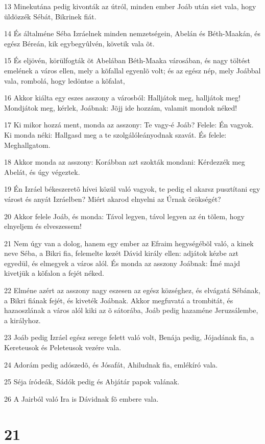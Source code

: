 \par 13 Minekutána pedig kivonták az útról, minden ember Joáb után siet vala, hogy üldözzék Sébát, Bikrinek fiát.
\par 14 És általméne Séba Izráelnek minden nemzetségein, Abelán és Béth-Maakán, és egész Béreán, kik egybegyûlvén, követik vala õt.
\par 15 És eljövén, körülfogták õt Abelában Béth-Maaka városában, és nagy töltést emelének a város ellen, mely a kõfallal egyenlõ volt; és az egész nép, mely Joábbal vala, rombolá, hogy ledöntse a kõfalat,
\par 16 Akkor kiálta egy eszes asszony a városból: Halljátok meg, halljátok meg! Mondjátok meg, kérlek, Joábnak: Jõjj ide hozzám, valamit mondok néked!
\par 17 Ki mikor hozzá ment, monda az asszony: Te vagy-é Joáb? Felele: Én vagyok. Ki monda néki: Hallgasd meg a te szolgálóleányodnak szavát. És felele: Meghallgatom.
\par 18 Akkor monda az asszony: Korábban azt szokták mondani: Kérdezzék meg Abelát, és úgy végeztek.
\par 19 Én Izráel békeszeretõ hívei közül való vagyok, te pedig el akarsz pusztítani egy várost és anyát Izráelben? Miért akarod elnyelni az Úrnak örökségét?
\par 20 Akkor felele Joáb, és monda: Távol legyen, távol legyen az én tõlem, hogy elnyeljem és elveszessem!
\par 21 Nem úgy van a dolog, hanem egy ember az Efraim hegységébõl való, a kinek neve Séba, a Bikri fia, felemelte kezét Dávid király ellen: adjátok kézbe azt egyedül, és elmegyek a város alól. És monda az asszony Joábnak: Ímé majd kivetjük a kõfalon a fejét néked.
\par 22 Elméne azért az asszony nagy eszesen az egész községhez, és elvágatá Sébának, a Bikri fiának fejét, és kiveték Joábnak. Akkor megfuvatá a trombitát, és hazaoszlának a város alól kiki az õ sátorába, Joáb pedig hazaméne Jeruzsálembe, a királyhoz.
\par 23 Joáb pedig Izráel egész serege felett való volt, Benája pedig, Jójadának fia, a Kereteusok és Peleteusok vezére vala.
\par 24 Adorám pedig adószedõ, és Jósafát, Ahiludnak fia, emlékíró vala.
\par 25 Séja íródeák, Sádók pedig és Abjátár papok valának.
\par 26 A Jairból való Ira is Dávidnak fõ embere vala.

\chapter{21}

